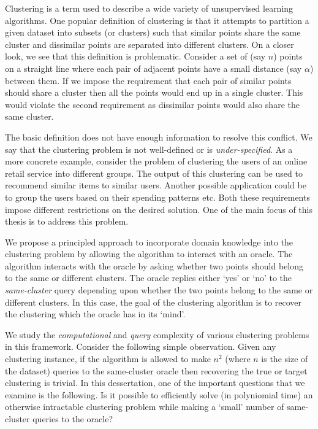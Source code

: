 \documentclass[12pt]{article}
\begin{document}
\fi

Clustering is a term used to describe a wide variety of unsupervised learning algorithms. One popular definition of clustering is that it attempts to partition a given dataset into subsets (or clusters) such that similar points share the same cluster and dissimilar points are separated into different clusters. On a closer look, we see that this definition is problematic. Consider a set of (say $n$) points on a straight line where each pair of adjacent points have a small distance (say $\alpha$) between them. If we impose the requirement that each pair of similar points should share a cluster then all the points would end up in a single cluster. This would violate the second requirement as dissimilar points would also share the same cluster. 

The basic definition does not have enough information to resolve this conflict. We say that the clustering problem is not well-defined or is \textit{under-specified}. As a more concrete example, consider the problem of clustering the users of an online retail service into different groups. The output of this clustering can be used to recommend similar items to similar users. Another possible application could be to group the users based on their spending patterns etc. Both these requirements impose different restrictions on the desired solution. One of the main focus of this thesis is to address this problem. 

We propose a principled approach to incorporate domain knowledge into the clustering problem by allowing the algorithm to interact with an oracle. The algorithm interacts with the oracle by asking whether two points should belong to the same or different clusters. The oracle replies either `yes' or `no' to the \textit{same-cluster} query depending upon whether the two points belong to the same or different clusters. In this case, the goal of the clustering algorithm is to recover the clustering which the oracle has in its `mind'.

We study the \textit{computational} and \textit{query} complexity of various clustering problems in this framework. Consider the following simple observation. Given any clustering instance, if the algorithm is allowed to make $n^2$ (where $n$ is the size of the dataset) queries to the same-cluster oracle then recovering the true or target clustering is trivial. In this dessertation, one of the important questions that we examine is the following. {Is it possible to efficiently solve (in polyniomial time) an otherwise intractable clustering problem while making a `small' number of same-cluster queries to the oracle?}  
\end{document}
